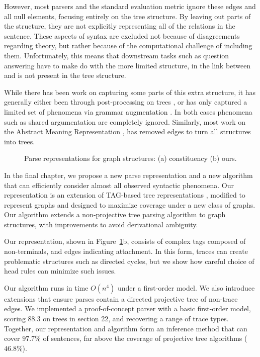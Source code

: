 However, most parsers and the standard evaluation metric ignore these edges and all null elements, focusing entirely on the tree structure.
By leaving out parts of the structure, they are not explicitly representing all of the relations in the sentence.
These aspects of syntax are excluded not because of disagreements regarding theory, but rather because of the computational challenge of including them.
Unfortunately, this means that downstream tasks such as question answering have to make do with the more limited structure, \myeg in  the link between  and  is not present in the tree structure.

While there has been work on capturing some parts of this extra structure, it has generally either been through post-processing on trees \parencite{Johnson:2002,Jijkoun:2003,Campbell:2004,Levy:2004,Gabbard:2006}, or has only captured a limited set of phenomena via grammar augmentation \parencite{Collins:1997,dienes-dubey:2003,schmid:2006,cai-chiang-goldberg:2011}.
In both cases phenomena such as shared argumentation are completely ignored.
Similarly, most work on the Abstract Meaning Representation \parencite{amr}, has removed edges to turn all structures into trees.

\begin{figure}
  \centering
  \scalebox{1.0}{
    
  }
  \caption[Parse representations for graph structures.]{ \label{fig:repr}
    Parse representations for graph structures: (a) constituency (b) ours.
  }
\end{figure}

In the final chapter, we propose a new parse representation and a new algorithm that can efficiently consider almost all observed syntactic phenomena.
Our representation is an extension of TAG-based tree representations \parencite{cck,Shen:2007}, modified to represent graphs and designed to maximize coverage under a new class of graphs.
Our algorithm extends a non-projective tree parsing algorithm \parencite{ec} to graph structures, with improvements to avoid derivational ambiguity.

Our representation, shown in Figure~\ref{fig:repr}b, consists of complex tags composed of non-terminals, and edges indicating attachment.
In this form, traces can create problematic structures such as directed cycles, but we show how careful choice of head rules can minimize such issues.

Our algorithm runs in time $O(n^4)$ under a first-order model.
We also introduce extensions that ensure parses contain a directed projective tree of non-trace edges.
We implemented a proof-of-concept parser with a basic first-order model, scoring $88.3$ on trees in section 22, and recovering a range of trace types.
Together, our representation and algorithm form an inference method that can cover $97.7\%$ of sentences, far above the coverage of projective tree algorithms ($46.8\%$).

